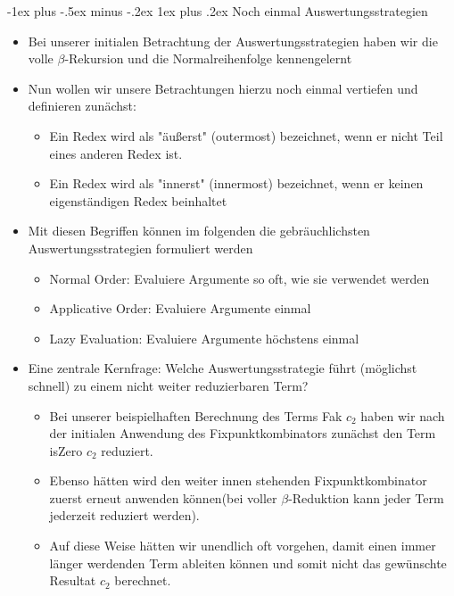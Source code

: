 \documentclass[10pt]{article}
\makeatletter
\renewcommand{\subsubsection}{\@startsection{subsubsection}{3}{0mm}%
                                {-1ex plus -.5ex minus -.2ex}%
                                {1ex plus .2ex}%
                                {\normalfont\small\bfseries}}
\makeatother
\begin{document}
\subsubsection{Noch einmal Auswertungsstrategien}
\begin{itemize}
  \item Bei unserer initialen Betrachtung der Auswertungsstrategien haben wir die volle $\beta$-Rekursion und die Normalreihenfolge kennengelernt
  \item Nun wollen wir unsere Betrachtungen hierzu noch einmal vertiefen und definieren zunächst:
        \begin{itemize}
          \item Ein Redex wird als \color{blue} "äußerst" (outermost) \color{black} bezeichnet, wenn er nicht Teil eines anderen Redex ist.
          \item Ein Redex wird als \color{blue} "innerst" (innermost) \color{black} bezeichnet, wenn er keinen eigenständigen Redex beinhaltet
        \end{itemize}
  \item Mit diesen Begriffen können im folgenden die gebräuchlichsten Auswertungsstrategien formuliert werden
        \begin{itemize}
          \item \color{blue} Normal Order: \color{black} Evaluiere Argumente so oft, wie sie verwendet werden
          \item \color{blue} Applicative Order: \color{black} Evaluiere Argumente einmal
          \item \color{blue} Lazy Evaluation: \color{black} Evaluiere Argumente höchstens einmal
        \end{itemize}
  \item Eine zentrale Kernfrage: \color{blue} Welche Auswertungsstrategie führt (möglichst schnell) zu einem nicht weiter reduzierbaren Term?
        \color{black}
        \begin{itemize}
          \item Bei unserer beispielhaften Berechnung des Terms Fak $c_2$ haben wir nach der initialen Anwendung des Fixpunktkombinators zunächst den Term isZero $c_2$ reduziert.
          \item Ebenso hätten wird den weiter innen stehenden Fixpunktkombinator zuerst erneut anwenden können(bei voller $\beta$-Reduktion kann jeder Term jederzeit reduziert werden).
          \item Auf diese Weise hätten wir unendlich oft vorgehen, damit einen immer länger werdenden Term ableiten können und somit nicht das gewünschte Resultat $c_2$ berechnet.

\end{itemize}
\end{itemize}
\end{document}
